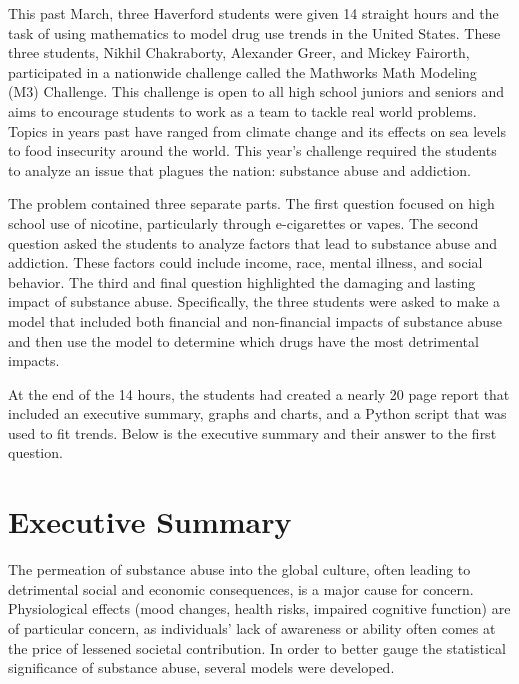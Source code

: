 
This past March, three Haverford students were given 14 straight hours and the task of using mathematics to model drug use trends in the United States. These three students, Nikhil Chakraborty, Alexander Greer, and Mickey Fairorth, participated in a nationwide challenge called the Mathworks Math Modeling (M3) Challenge. This challenge is open to all high school juniors and seniors and aims to encourage students to work as a team to tackle real world problems. Topics in years past have ranged from climate change and its effects on sea levels to food insecurity around the world. This year’s challenge required the students to analyze an issue that plagues the nation: substance abuse and addiction.

The problem contained three separate parts. The first question focused on high school use of nicotine, particularly through e-cigarettes or vapes. The second question asked the students to analyze factors that lead to substance abuse and addiction. These factors could include income, race, mental illness, and social behavior. The third and final question highlighted the damaging and lasting impact of substance abuse. Specifically, the three students were asked to make a model that included both financial and non-financial impacts of substance abuse and then use the model to determine which drugs have the most detrimental impacts.

At the end of the 14 hours, the students had created a nearly 20 page report that included an executive summary, graphs and charts, and a Python script that was used to fit trends. Below is the executive summary and their answer to the first question.

\section*{Executive Summary}

The permeation of substance abuse into the global culture, often leading to detrimental social and economic consequences, is a major cause for concern. Physiological effects (mood changes, health risks, impaired cognitive function) are of particular concern, as individuals’ lack of awareness or ability often comes at the price of lessened societal contribution. In order to better gauge the statistical significance of substance abuse, several models were developed.

